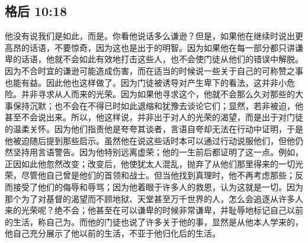 \par


\subsection{格后 10:18}

\par

他没有说我们是如此，而是。你看他说话多么谦逊？但是，如果他在继续时说出更高昂的话语，不要惊奇，因为这也是出于的明智。因为如果他在每一部分都只讲谦卑的话语，他就不会如此有效地打击这些人，也不会使门徒从他们的错误中解脱。因为不合时宜的谦逊可能造成伤害，而在适当的时候说一些关于自己的可称赞之事也能有益。因此他也这样做了。因为门徒被诱导对产生卑下的看法，这并非小危险。并非寻求从人而来的光荣。因为如果他寻求这个，他就不会那么久对那些的大事保持沉默；也不会在不得已时如此退缩和犹豫去谈论它们；显然，若非被迫，他甚至不会说出来。所以，他这样说，并非出于对人的光荣的渴望，而是出于对门徒的温柔关怀。因为他们指责他是夸夸其谈者，言语自夸却无法在行动中证明，于是他被迫随后提到那些启示。虽然他在说这些话时本可以通过行动说服他们，但他仍然坚持用言语警告。因为他特别远离虚荣；他的一生前后都证明了这一点。例如，正因如此他忽然改变；改变后，他使犹太人混乱，抛弃了从他们那里得来的一切光荣，尽管他自己曾是他们的首领和战士。但当他找到真理时，他不再考虑那些；反而接受了他们的侮辱和辱骂；因为他着眼于许多人的救恩，认为这就是一切。因为那个为了对基督的渴望而不顾地狱、天堂甚至万千世界的人，怎么会追逐从许多人来的光荣呢？绝不会；他甚至在可以谦卑的时候非常谦卑，并耻辱地标记自己以前的生活，称自己为。而他的门徒也说了许多关于他的事，显然是从他本人学来的，他自己充分展示了他以前的生活，不亚于他归化后的生活。\par

